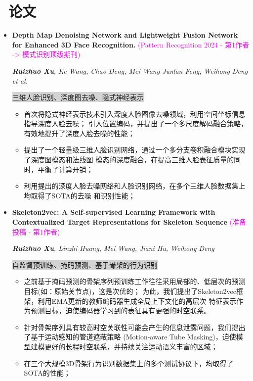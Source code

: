 \documentclass{resume}
\begin{document}
\section{\faInfo\ 论文}
\begin{itemize}[parsep=0.5ex]
  \item \textbf{Depth Map Denoising Network and Lightweight Fusion Network for Enhanced 3D Face Recognition.}
        \textcolor{magenta}{(Pattern Recognition 2024 - 第1作者 -> 模式识别顶级期刊)}
        \href{https://www.sciencedirect.com/science/article/pii/S0031320323006349}{\textcolor{linkcolor}{\faExternalLink{}}}

        \textit{\textbf{Ruizhuo Xu}, Ke Wang, Chao Deng, Mei Wang Junlan Feng, Weihong Deng et al.}

        \colorbox{lightgray}{三维人脸识别、深度图去噪、隐式神经表示}

        \begin{itemize}[parsep=0.5ex]
          \item 首次将隐式神经表示技术引入深度人脸图像去噪领域，利用空间坐标信息指导深度人脸去噪；
                引入位置编码，并提出了一个多尺度解码融合策略，有效地提升了深度人脸去噪的性能；
          \item 提出了一个轻量级三维人脸识别网络，通过一个多分支卷积融合模块实现了深度图模态和法线图
                模态的深度融合，在提高三维人脸表征质量的同时，平衡了计算开销；
          \item 利用提出的深度人脸去噪网络和人脸识别网络，在多个三维人脸数据集上均取得了SOTA的去噪
                和识别性能；
        \end{itemize}
        
  \item \textbf{Skeleton2vec: A Self-supervised Learning Framework with Contextualized Target Representations for Skeleton Sequence}
        \textcolor{magenta}{(准备投稿 - 第1作者)}
        \href{https://arxiv.org/abs/2401.00921}{\textcolor{linkcolor}{\faExternalLink{}}}

        \textit{\textbf{Ruizhuo Xu}, Linzhi Huang, Mei Wang, Jiani Hu, Weihong Deng}

        \colorbox{lightgray}{自监督预训练、掩码预测、基于骨架的行为识别}

        \begin{itemize}[parsep=0.5ex]
          \item 之前基于掩码预测的骨架序列预训练工作往往采用局部的、低层次的预测目标(如：原始关节点)，这是次优的；
                为此，我们提出了Skeleton2vec框架，利用EMA更新的教师编码器生成全局上下文化的高层次
                特征表示作为预测目标，迫使编码器学习到的表征具有更强的时空联系。
          \item 针对骨架序列具有较高时空关联性可能会产生的信息泄露问题，我们提出了基于运动感知的管道遮蔽策略
                (Motion-aware Tube Masking)，迫使模型建模更好的长程时空联系，并持续关注运动语义丰富的区域；
          \item 在三个大规模3D骨架行为识别数据集上的多个测试协议下，均取得了SOTA的性能；
        \end{itemize}
        

\end{itemize}
\end{document}
